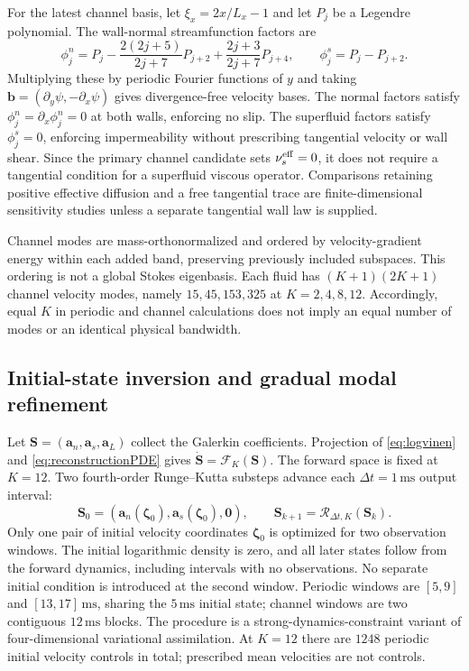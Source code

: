 \documentclass[11pt]{article}
\numberwithin{equation}{section}
\begin{document}
For the latest channel basis, let $\xi_x=2x/L_x-1$ and let $P_j$ be a Legendre polynomial. The wall-normal streamfunction factors are
\begin{equation}
 \phi_j^n=P_j-\frac{2(2j+5)}{2j+7}P_{j+2}
                  +\frac{2j+3}{2j+7}P_{j+4},
 \qquad \phi_j^s=P_j-P_{j+2}.
 \label{eq:wallbasis}
\end{equation}
Multiplying these by periodic Fourier functions of $y$ and taking $\mathbf b=(\partial_y\psi,-\partial_x\psi)$ gives divergence-free velocity bases. The normal factors satisfy $\phi_j^n=\partial_x\phi_j^n=0$ at both walls, enforcing no slip. The superfluid factors satisfy $\phi_j^s=0$, enforcing impermeability without prescribing tangential velocity or wall shear. Since the primary channel candidate sets $\nu_s^{\rm eff}=0$, it does not require a tangential condition for a superfluid viscous operator. Comparisons retaining positive effective diffusion and a free tangential trace are finite-dimensional sensitivity studies unless a separate tangential wall law is supplied.

Channel modes are mass-orthonormalized and ordered by velocity-gradient energy within each added band, preserving previously included subspaces. This ordering is not a global Stokes eigenbasis. Each fluid has $(K+1)(2K+1)$ channel velocity modes, namely $15,45,153,325$ at $K=2,4,8,12$. Accordingly, equal $K$ in periodic and channel calculations does not imply an equal number of modes or an identical physical bandwidth.

\subsection{Initial-state inversion and gradual modal refinement}
\label{sec:inversion}

Let $\mathbf S=(\mathbf a_n,\mathbf a_s,\mathbf a_L)$ collect the Galerkin coefficients. Projection of \eqref{eq:logvinen} and \eqref{eq:reconstructionPDE} gives $\dot{\mathbf S}=\mathcal F_K(\mathbf S)$. The forward space is fixed at $K=12$. Two fourth-order Runge--Kutta substeps advance each $\Delta t=1\,\mathrm{ms}$ output interval:
\begin{equation}
 \mathbf S_0=(\mathbf a_n(\bm\zeta_0),\mathbf a_s(\bm\zeta_0),\mathbf0),
 \qquad
 \mathbf S_{k+1}=\mathcal R_{\Delta t,K}(\mathbf S_k).
 \label{eq:stateevolution}
\end{equation}
Only one pair of initial velocity coordinates $\bm\zeta_0$ is optimized for two observation windows. The initial logarithmic density is zero, and all later states follow from the forward dynamics, including intervals with no observations. No separate initial condition is introduced at the second window. Periodic windows are $[5,9]$ and $[13,17]\,\mathrm{ms}$, sharing the $5\,\mathrm{ms}$ initial state; channel windows are two contiguous $12\,\mathrm{ms}$ blocks. The procedure is a strong-dynamics-constraint variant of four-dimensional variational assimilation. At $K=12$ there are $1248$ periodic initial velocity controls in total; prescribed mean velocities are not controls.
\end{document}
